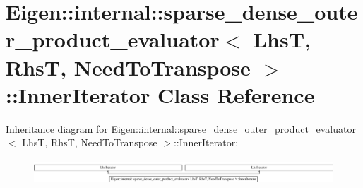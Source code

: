 \hypertarget{class_eigen_1_1internal_1_1sparse__dense__outer__product__evaluator_1_1_inner_iterator}{}\section{Eigen\+:\+:internal\+:\+:sparse\+\_\+dense\+\_\+outer\+\_\+product\+\_\+evaluator$<$ LhsT, RhsT, Need\+To\+Transpose $>$\+:\+:Inner\+Iterator Class Reference}
\label{class_eigen_1_1internal_1_1sparse__dense__outer__product__evaluator_1_1_inner_iterator}
Inheritance diagram for Eigen\+:\+:internal\+:\+:sparse\+\_\+dense\+\_\+outer\+\_\+product\+\_\+evaluator$<$ LhsT, RhsT, Need\+To\+Transpose $>$\+:\+:Inner\+Iterator\+:\begin{figure}[H]
\begin{center}
\leavevmode
\includegraphics[height=0.924092cm]{class_eigen_1_1internal_1_1sparse__dense__outer__product__evaluator_1_1_inner_iterator}
\end{center}
\end{figure}
